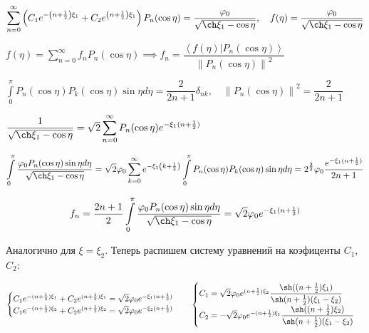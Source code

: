 \documentclass[a4paper,12pt]{article}
\begin{document}
	\begin{center}
		$\displaystyle\sum\limits_{n=0}^{\infty} \left(C_1 e^{-\left(n+\frac{1}{2}\right)\xi_1} + C_2 e^{\left(n+\frac{1}{2}\right)\xi_1} \right)P_n(\cos\eta) = \dfrac{\varphi_0}{\sqrt{\ch\xi_1 - \cos\eta}}, \quad f(\eta) = \dfrac{\varphi_0}{\sqrt{\ch\xi_1 - \cos\eta}}$
		
		$f(\eta) = \displaystyle\sum\limits_{n=0}^{\infty} f_n P_n(\cos\eta) \implies f_n = \dfrac{\left<f(\eta) | P_n(\cos\eta)\right>}{\left\| P_n(\cos\eta)\right\|^2} $
		
		$\displaystyle\int\limits_{0}^{\pi} P_n (\cos\eta) P_k(\cos\eta) \sin\eta d\eta = \dfrac{2}{2n+1}\delta_{nk}, \quad \left\|P_n (\cos\eta)\right\|^2 = \dfrac{2}{2n + 1}$
		
		$\dfrac{1}{\sqrt{\ch\xi_1 - \cos\eta}} = \sqrt{2}\displaystyle\sum\limits_{n=0}^{\infty} P_n(\cos\eta)e^{-\xi_1(n+\frac{1}{2})}$
		
		$\displaystyle\int\limits_{0}^{\pi} \dfrac{\varphi_0 P_n(\cos\eta)\sin\eta d\eta}{\sqrt{\ch\xi_1 - \cos\eta}} = \sqrt{2}\varphi_0\displaystyle\sum\limits_{k=0}^{\infty}e^{-\xi_1\left(k+\frac{1}{2}\right)}\displaystyle\int\limits_{0}^{\pi} P_n (\cos\eta)P_k (\cos\eta) \sin\eta d\eta = 2^{\frac{3}{2}}\varphi_0  \dfrac{e^{-\xi_1(n+\frac{1}{2})}}{2n+1}$
	\end{center}
	
	\begin{equation}
		f_n = \dfrac{2n + 1}{2} \displaystyle\int\limits_{0}^{\pi} \dfrac{\varphi_0 P_n (\cos\eta) \sin \eta d\eta}{\sqrt{\ch \xi_1 - \cos\eta}} = \sqrt{2}\varphi_0 e^{-\xi_1 (n+\frac{1}{2})} 
	\end{equation}
	
	\quad Аналогично для $\xi = \xi_2$. Теперь распишем систему уравнений на коэфиценты $C_1$, $C_2$: 
	
	\begin{center}
		$\begin{cases} 
			C_1 e^{-(n+\frac{1}{2})\xi_1} + C_2 e^{(n+\frac{1}{2})\xi_1} = \sqrt{2}\varphi_0 e^{-\xi_1 (n+\frac{1}{2})} \\
			C_1 e^{-(n+\frac{1}{2})\xi_2} + C_2 e^{(n+\frac{1}{2})\xi_2} = \sqrt{2}\varphi_0 e^{-\xi_2 (n+\frac{1}{2})}
		\end{cases} \quad \begin{cases}
			C_1 = \sqrt{2}\varphi_0 e^{(n+\frac{1}{2})\xi_2} \dfrac{\sh ((n+\frac{1}{2})\xi_1)}{\sh(n+\frac{1}{2})(\xi_1 - \xi_2)} \\
			C_2 = -\sqrt{2}\varphi_0 e^{-(n+\frac{1}{2})\xi_1} \dfrac{\sh ((n+\frac{1}{2})\xi_2)}{\sh(n+\frac{1}{2})(\xi_1 - \xi_2)}
		\end{cases}$
	\end{center}
	
\end{document}
